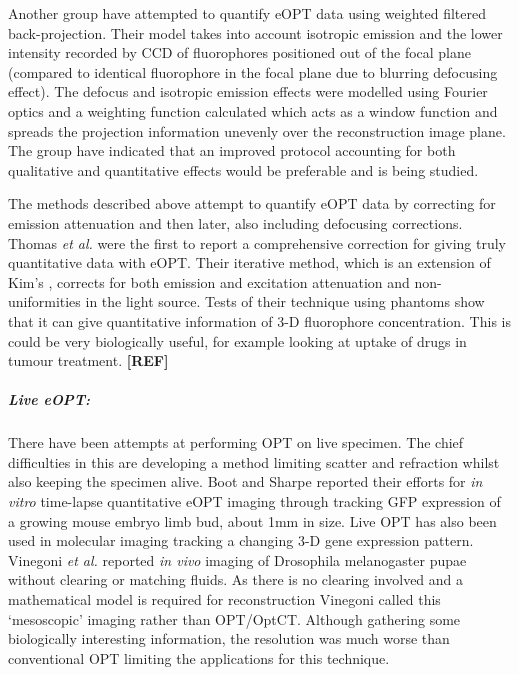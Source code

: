 \documentclass[12pt]{article}
\begin{document}
Another group have attempted to quantify eOPT data using weighted filtered back-projection. \cite{Darrell:2008gd} Their model takes into account isotropic emission and the lower intensity recorded by CCD of fluorophores positioned out of the focal plane (compared to identical fluorophore in the focal plane due to blurring defocusing effect). The defocus and isotropic emission effects were modelled using Fourier optics and a weighting function calculated which acts as a window function and spreads the projection information unevenly over the reconstruction image plane. The group have indicated that an improved protocol accounting for both qualitative and quantitative effects would be preferable and is being studied.


The methods described above attempt to quantify eOPT data by correcting for emission attenuation and then later, also including defocusing corrections. Thomas \textit{et al.} were the first to report a comprehensive correction for giving truly quantitative data with eOPT.\cite{Thomas:2010gt} Their iterative method, which is an extension of Kim's \cite{Kim:2008eua}, corrects for both emission and excitation attenuation and non-uniformities in the light source. 
Tests of their technique using phantoms show that it can give quantitative information of 3-D fluorophore concentration. This is could be very biologically useful, for example looking at uptake of drugs in tumour treatment. \textbf{[REF]}

  




\subparagraph{Live eOPT:} 
There have been attempts at performing OPT  on live specimen. \cite{Boot:2008dt, Vinegoni:2008ix, Colas:2009} The chief difficulties in this are developing a method limiting scatter and refraction  whilst also keeping the specimen alive. Boot and Sharpe reported their efforts for \textit{in vitro} time-lapse quantitative eOPT  imaging through tracking GFP expression of a growing mouse embryo limb bud, about 1mm in size. \cite{Boot:2008dt} 
Live OPT has also been used in molecular imaging tracking a changing 3-D gene expression pattern. \cite{Colas:2009}
Vinegoni \textit{et al.} reported \textit{in vivo} imaging of Drosophila melanogaster pupae without clearing or matching fluids. \cite{Vinegoni:2008ix}  As there is no clearing involved and a mathematical model is required for reconstruction Vinegoni called this `mesoscopic' imaging rather than OPT/OptCT.  
Although gathering some biologically interesting information, the resolution was much worse than conventional OPT limiting the applications for this technique. 
\end{document}
